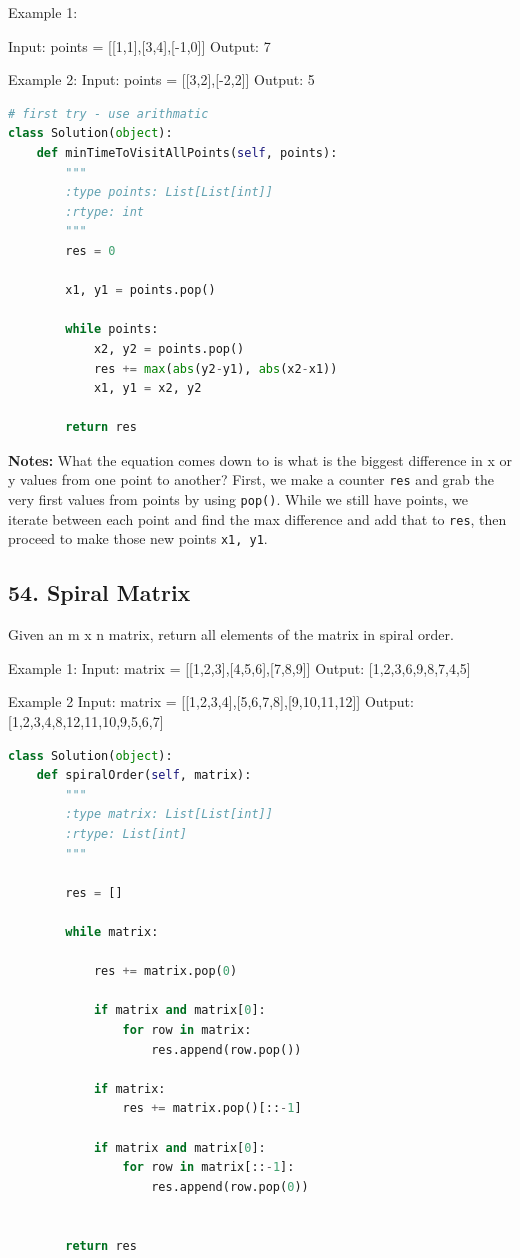 \documentclass[11pt]{article}
\begin{document}
Example 1:

Input: points = [[1,1],[3,4],[-1,0]]
Output: 7

Example 2:
Input: points = [[3,2],[-2,2]]
Output: 5


\begin{lstlisting}[language=python, mathescape=true]
# first try - use arithmatic
class Solution(object):
    def minTimeToVisitAllPoints(self, points):
        """
        :type points: List[List[int]]
        :rtype: int
        """
        res = 0

        x1, y1 = points.pop()

        while points:
            x2, y2 = points.pop()
            res += max(abs(y2-y1), abs(x2-x1))
            x1, y1 = x2, y2
        
        return res
\end{lstlisting}

\noindent \textbf{Notes:} What the equation comes down to is what is the biggest difference in x or y values from one point to another? First, we make a counter \texttt{res} and grab the very first values from points by using \texttt{pop()}. While we still have points, we iterate between each point and find the max difference and add that to \texttt{res}, then proceed to make those new points \texttt{x1, y1}.

\subsection*{54. Spiral Matrix}
Given an m x n matrix, return all elements of the matrix in spiral order.

Example 1:
Input: matrix = [[1,2,3],[4,5,6],[7,8,9]]
Output: [1,2,3,6,9,8,7,4,5]

Example 2
Input: matrix = [[1,2,3,4],[5,6,7,8],[9,10,11,12]]
Output: [1,2,3,4,8,12,11,10,9,5,6,7]

\begin{lstlisting}[language=python, mathescape=true]
class Solution(object):
    def spiralOrder(self, matrix):
        """
        :type matrix: List[List[int]]
        :rtype: List[int]
        """

        res = []

        while matrix:

            res += matrix.pop(0)

            if matrix and matrix[0]:
                for row in matrix:
                    res.append(row.pop())
            
            if matrix:
                res += matrix.pop()[::-1]

            if matrix and matrix[0]:
                for row in matrix[::-1]:
                    res.append(row.pop(0))


        return res
\end{lstlisting}
\end{document}
